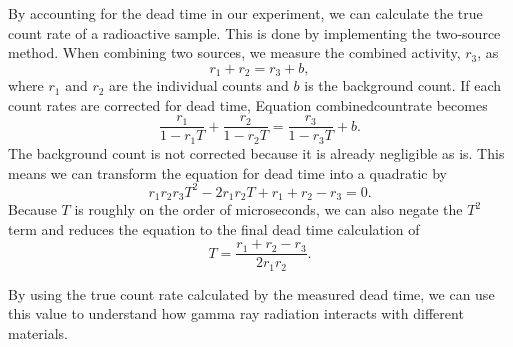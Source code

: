 \par By accounting for the dead time in our experiment, we can calculate the true count rate of a radioactive sample. This is done by implementing the two-source method. When combining two sources, we measure the combined activity, $r_3$, as 
\begin{equation}
r_1 + r_2 = r_3 + b,
\label{eq:combinedcountrate}
\end{equation}
where $r_1$ and $r_2$ are the individual counts and $b$ is the background count. If each count rates are corrected for dead time, Equation {combinedcountrate} becomes
\begin{equation}
\frac{r_1}{1-r_1 T} + \frac{r_2}{1-r_2 T} = \frac{r_3}{1-r_3 T} + b.
\label{eq:cominedwithdeadtime}
\end{equation}
The background count is not corrected because it is already negligible as is. This means we can transform the equation for dead time into a quadratic by
\begin{equation}
r_1 r_2 r_3 T^2 - 2r_1 r_2 T + r_1 + r_2 - r_3 = 0.
\label{eq:quaddeadtime}
\end{equation}
Because $T$ is roughly on the order of microseconds, we can also negate the $T^2$ term and reduces the equation to the final dead time calculation of 
\begin{equation}
T = \frac{r_1 + r_2 - r_3}{2r_1 r_2}.
\label{eq:deadtime}
\end{equation}

\par By using the true count rate calculated by the measured dead time, we can use this value to understand how gamma ray radiation interacts with different materials. 
